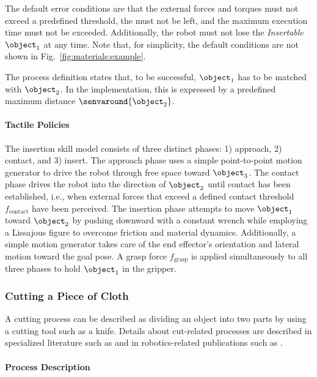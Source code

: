 The default error conditions are that the external forces and torques must not exceed a predefined threshold, the \roi{} must not be left, and the maximum execution time must not be exceeded.
Additionally, the robot must not lose the \textit{Insertable} $\object_1$ at any time.
Note that, for simplicity, the default conditions are not shown in Fig.~\ref{fig:materials:example}.

The process definition states that, to be successful, $\object_1$ has to be matched with $\object_2$.
In the implementation, this is expressed by a predefined maximum distance $\senvaround{\object_2}$.

\paragraph{Tactile Policies}

The insertion skill model consists of three distinct phases: 1) approach, 2) contact, and 3) insert.
The approach phase uses a simple point-to-point motion generator to drive the robot through free space toward $\object_3$.
The contact phase drives the robot into the direction of $\object_2$ until contact has been established, i.e., when external forces that exceed a defined contact threshold $f_\text{contact}$ have been perceived.
The insertion phase attempts to move $\object_1$ toward $\object_2$ by pushing downward with a constant wrench while employing a Lissajous figure to overcome friction and material dynamics.
Additionally, a simple motion generator takes care of the end effector's orientation and lateral motion toward the goal pose.
A grasp force $f_\text{grasp}$ is applied simultaneously to all three phases to hold $\object_1$ in the gripper.

\subsubsection{Cutting a Piece of Cloth}

A cutting process can be described as dividing an object into two parts by using a cutting tool such as a knife.
Details about cut-related processes are described in specialized literature such as \cite{dietrich2018schneiden} and in robotics-related publications such as \cite{bogue2008cutting}.

\paragraph{Process Description}

